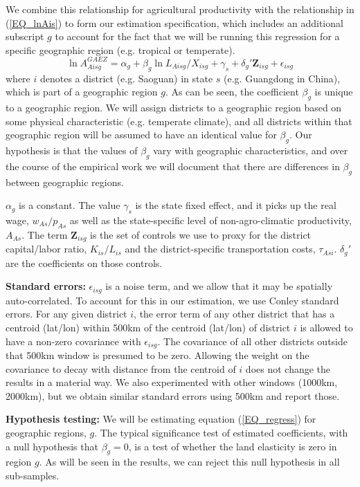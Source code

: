 \documentclass[11pt]{article}
\begin{document}
We combine this relationship for agricultural productivity with the relationship in (\ref{EQ_lnAis}) to form our estimation specification, which includes an additional subscript $g$ to account for the fact that we will be running this regression for a specific geographic region (e.g. tropical or temperate).
\begin{equation}
\ln A^{GAEZ}_{Aisg} = \alpha_g + \beta_g \ln L_{Aisg}/X_{isg} + \gamma_{s} + \delta_g' \mathbf{Z}_{isg} + \epsilon_{isg} \label{EQ_regress}
\end{equation}
where $i$ denotes a district (e.g. Saoguan) in state $s$ (e.g. Guangdong in China), which is part of a geographic region $g$. As can be seen, the coefficient $\beta_g$ is unique to a geographic region. We will assign districts to a geographic region based on some physical characteristic (e.g. temperate climate), and all districts within that geographic region will be assumed to have an identical value for $\beta_g$. Our hypothesis is that the values of $\beta_g$ vary with geographic characteristics, and over the course of the empirical work we will document that there are differences in $\beta_g$ between geographic regions.

$\alpha_g$ is a constant. The value $\gamma_s$ is the state fixed effect, and it picks up the real wage, $w_{As}/p_{As}$ as well as the state-specific level of non-agro-climatic productivity, $A_{As}$. The term $\mathbf{Z}_{isg}$ is the set of controls we use to proxy for the district capital/labor ratio, $K_{is}/L_{is}$ and the district-specific transportation costs, $\tau_{Asi}$. $\delta_g'$ are the coefficients on those controls.

\vspace{.5cm}\noindent\textbf{Standard errors:} $\epsilon_{isg}$ is a noise term, and we allow that it may be spatially auto-correlated. To account for this in our estimation, we use Conley standard errors. For any given district $i$, the error term of any other district that has a centroid (lat/lon) within 500km of the centroid (lat/lon) of district $i$ is allowed to have a non-zero covariance with $\epsilon_{isg}$. The covariance of all other districts outside that 500km window is presumed to be zero. Allowing the weight on the covariance to decay with distance from the centroid of $i$ does not change the results in a material way. We also experimented with other windows (1000km, 2000km), but we obtain similar standard errors using 500km and report those.

\vspace{.5cm}\noindent\textbf{Hypothesis testing:} We will be estimating equation (\ref{EQ_regress}) for geographic regions, $g$. The typical significance test of estimated coefficients, with a null hypothesis that $\beta_g=0$, is a test of whether the land elasticity is zero in region $g$. As will be seen in the results, we can reject this null hypothesis in all sub-samples.
\end{document}
